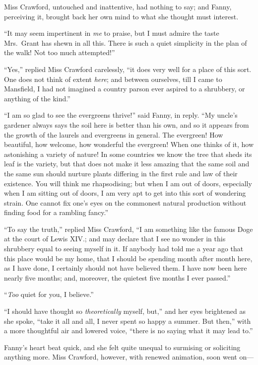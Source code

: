 \documentclass{article}
\begin{document}
Miss Crawford, untouched and inattentive, had nothing
to say; and Fanny, perceiving it, brought back her own
mind to what she thought must interest.

``It may seem impertinent in \emph{me} to praise, but I must
admire the taste Mrs.\ Grant has shewn in all this.
There is such a quiet simplicity in the plan of the walk!
Not too much attempted!''

``Yes,'' replied Miss Crawford carelessly, ``it does
very well for a place of this sort.  One does not think
of extent \emph{here}; and between ourselves, till I came
to Mansfield, I had not imagined a country parson
ever aspired to a shrubbery, or anything of the kind.''

``I am so glad to see the evergreens thrive!'' said Fanny,
in reply.  ``My uncle's gardener always says the soil here
is better than his own, and so it appears from the growth
of the laurels and evergreens in general.  The evergreen!
How beautiful, how welcome, how wonderful the evergreen!
When one thinks of it, how astonishing a variety of nature!
In some countries we know the tree that sheds its leaf
is the variety, but that does not make it less amazing
that the same soil and the same sun should nurture plants
differing in the first rule and law of their existence.
You will think me rhapsodising; but when I am out of doors,
especially when I am sitting out of doors, I am very apt
to get into this sort of wondering strain.  One cannot fix
one's eyes on the commonest natural production without
finding food for a rambling fancy.''

``To say the truth,'' replied Miss Crawford, ``I am something
like the famous Doge at the court of Lewis XIV.;
and may declare that I see no wonder in this shrubbery
equal to seeing myself in it.  If anybody had told
me a year ago that this place would be my home,
that I should be spending month after month here, as I
have done, I certainly should not have believed them.
I have now been here nearly five months; and, moreover,
the quietest five months I ever passed.''

``\emph{Too} quiet for you, I believe.''

``I should have thought so \emph{theoretically} myself, but,''
and her eyes brightened as she spoke, ``take it all
and all, I never spent so happy a summer.  But then,''
with a more thoughtful air and lowered voice, ``there is
no saying what it may lead to.''

Fanny's heart beat quick, and she felt quite unequal
to surmising or soliciting anything more.  Miss Crawford,
however, with renewed animation, soon went on---%
\end{document}
